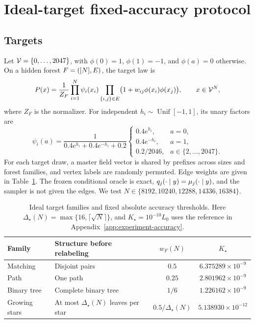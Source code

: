 \section{Ideal-target fixed-accuracy protocol}
\label{app:experiments}

\subsection{Targets}
\label{app:experiment-targets}

Let $\Vocab=\{0,\ldots,2047\}$, with $\phi(0)=1$, $\phi(1)=-1$,
and $\phi(a)=0$ otherwise. On a hidden forest
$\TargetForest=(\PositionSet,\TargetEdges)$, the target law is
\begin{equation}
 \TargetLaw(x)=\frac{1}{Z_F}
 \prod_{i=1}^N\psi_i(x_i)
 \prod_{\{i,j\}\in\TargetEdges}
 \bigl(1+w_{ij}\phi(x_i)\phi(x_j)\bigr),
 \qquad x\in\Vocab^N,
 \label{app:eq:experiment-target}
\end{equation}
where $Z_F$ is the normalizer. For independent
$h_i\sim\operatorname{Unif}[-1,1]$, its unary factors are
\begin{equation}
 \psi_i(a)=\frac{1}{0.4e^{h_i}+0.4e^{-h_i}+0.2}
 \begin{cases}
 0.4e^{h_i},&a=0,\\
 0.4e^{-h_i},&a=1,\\
 0.2/2046,&a\in\{2,\ldots,2047\}.
 \end{cases}
 \label{app:eq:experiment-unary}
\end{equation}
For each target draw, a master field vector is shared by prefixes across
sizes and forest families, and vertex labels are randomly permuted.
Edge weights are given in Table~\ref{tab:experiment-targets}.
The frozen conditional oracle is exact,
$\OracleRow{y}{j}=\ExactRow{y}{j}$, and the sampler is not given the edges.
We test $N\in\{8192,10240,12288,14336,16384\}$.

\begin{table}[htbp]
 \centering
 \caption{Ideal target families and fixed absolute accuracy thresholds.
 Here $\Delta_\star(N)=\max\{16,\lceil\sqrt N\rceil\}$, and
 $K_\star=10^{-10}L_0$ uses the reference in
 Appendix~\ref{app:experiment-accuracy}.}
 \label{tab:experiment-targets}
 \begin{tabular}{@{}llcc@{}}
 \toprule
 Family & Structure before relabeling & $w_F(N)$ & $K_\star$ \\
 \midrule
 Matching & Disjoint pairs & $0.5$ & $6.375289\times10^{-9}$ \\
 Path & One path & $0.25$ & $2.801962\times10^{-9}$ \\
 Binary tree & Complete binary tree & $1/6$ & $1.226162\times10^{-9}$ \\
 Growing stars & At most $\Delta_\star(N)$ leaves per star
   & $0.5/\Delta_\star(N)$ & $5.138930\times10^{-12}$ \\
 \bottomrule
 \end{tabular}
\end{table}

